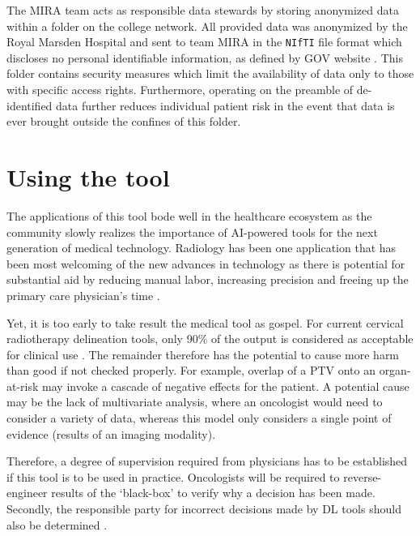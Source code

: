 \documentclass[11pt,twoside]{report}
\begin{document}
The MIRA team acts as responsible data stewards by storing anonymized data within a folder on the college network. All provided data was anonymized by the Royal Marsden Hospital and sent to team MIRA in the \texttt{NIfTI} file format which discloses no personal identifiable information, as defined by GOV website \cite{gov-gdpr}. This folder contains security measures which limit the availability of data only to those with specific access rights. Furthermore, operating on the preamble of de-identified data further reduces individual patient risk in the event that data is ever brought outside the confines of this folder.

\section{Using the tool}

The applications of this tool bode well in the healthcare ecosystem as the community slowly realizes the importance of AI-powered tools for the next generation of medical technology. Radiology has been one application that has been most welcoming of the new advances in technology as there is potential for substantial aid by reducing manual labor, increasing precision and freeing up the primary care physician's time \cite{overview-of-ai-medicine}.

Yet, it is too early to take result the medical tool as gospel. For current cervical radiotherapy delineation tools, only 90\% of the output is considered as acceptable for clinical use \cite{auto-delineation-cervical-cancer-development}. The remainder therefore has the potential to cause more harm than good if not checked properly. For example, overlap of a PTV onto an organ-at-risk may invoke a cascade of negative effects for the patient. A potential cause may be the lack of multivariate analysis, where an oncologist would need to consider a variety of data, whereas this model only considers a single point of evidence (results of an imaging modality).

Therefore, a degree of supervision required from physicians has to be established if this tool is to be used in practice. Oncologists will be required to reverse-engineer results of the `black-box' to verify why a decision has been made. Secondly, the responsible party for incorrect decisions made by DL tools should also be determined \cite{AI-in-cancer-diagnosis-era}.

\printbibliography
{}
\end{document}
